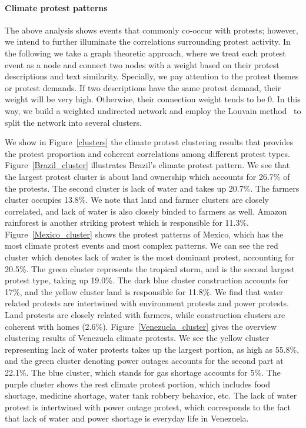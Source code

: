 \documentclass[9pt,twocolumn,twoside]{pnas-new}
\begin{document}
\paragraph{Climate protest patterns}
The above analysis shows events that commonly co-occur with protests; however, we intend to further illuminate the correlations surrounding protest activity.
In the following we take a graph theoretic approach, where we treat each protest event as a node and connect two nodes with a weight based on their protest descriptions and text similarity. Specially, we pay attention to the protest themes or protest demands. If two descriptions have the same protest demand, their weight will be very high. Otherwise, their connection weight tends to be 0. In this way, we build a weighted undirected network and employ the Louvain method~\cite{blondel2008fast} to split the network into several clusters.

We show in Figure~\ref{clusters} the climate protest clustering results that provides the protest proportion and coherent correlations among different protest types. Figure~\ref{Brazil_cluster} illustrates Brazil's climate protest pattern.
We see that the largest protest cluster is about land ownership which accounts for 26.7\% of the protests.
The second cluster is lack of water and takes up 20.7\%.
The farmers cluster occupies 13.8\%.
We note that land and farmer clusters are closely correlated, and lack of water is also closely binded to farmers as well. Amazon rainforest is another striking protest which is responsible for 11.3\%. Figure~\ref{Mexico_cluster} shows the protest patterns of Mexico, which has the most climate protest events and most complex patterns. We can see the red cluster which denotes lack of water is the most dominant protest, accounting for 20.5\%.
The green cluster represents the tropical storm, and is the second largest protest type, taking up 19.0\%.
The dark blue cluster construction accounts for 17\%, and the yellow cluster land is responsible for 11.8\%. We find that water related protests are intertwined with environment protests and power protests.
Land protests are closely related with farmers, while construction clusters are coherent with homes (2.6\%). Figure~\ref{Venezuela_cluster} gives the overview clustering results of Venezuela climate protests. We see the yellow cluster representing lack of water protests takes up the largest portion, as high as 55.8\%, and the green cluster denoting power outages accounts for the second part at 22.1\%. The blue cluster, which stands for gas shortage accounts for 5\%. The purple cluster shows the rest climate protest portion, which includes food shortage, medicine shortage, water tank robbery behavior, etc. The lack of water protest is intertwined with power outage protest, which corresponds to the fact that lack of water and power shortage is everyday life in Venezuela.
\end{document}
